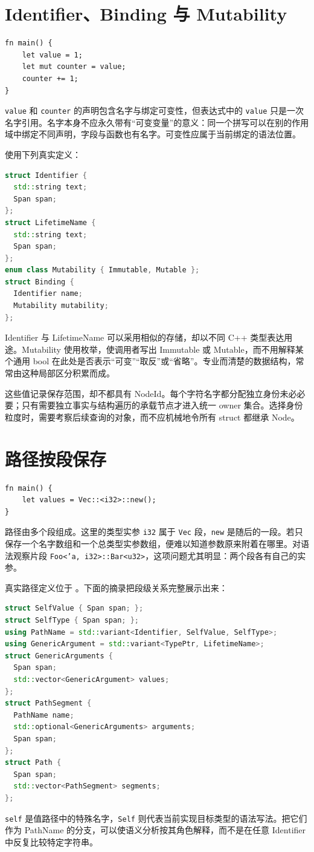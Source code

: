 \section{Identifier、Binding 与 Mutability}
\begin{lstlisting}[language=Rustless]
fn main() {
    let value = 1;
    let mut counter = value;
    counter += 1;
}
\end{lstlisting}
\texttt{value} 和 \texttt{counter} 的声明包含名字与绑定可变性，但表达式中的 \texttt{value} 只是一次名字引用。名字本身不应永久带有“可变变量”的意义：同一个拼写可以在别的作用域中绑定不同声明，字段与函数也有名字。可变性应属于当前绑定的语法位置。

 使用下列真实定义：
\begin{lstlisting}[language=C++]
struct Identifier {
  std::string text;
  Span span;
};
struct LifetimeName {
  std::string text;
  Span span;
};
enum class Mutability { Immutable, Mutable };
struct Binding {
  Identifier name;
  Mutability mutability;
};
\end{lstlisting}
Identifier 与 LifetimeName 可以采用相似的存储，却以不同 C++ 类型表达用途。Mutability 使用枚举，使调用者写出 Immutable 或 Mutable，而不用解释某个通用 bool 在此处是否表示“可变”“取反”或“省略”。专业而清楚的数据结构，常常由这种局部区分积累而成。

这些值记录保存范围，却不都具有 NodeId。每个字符名字都分配独立身份未必必要；只有需要独立事实与结构遍历的承载节点才进入统一 owner 集合。选择身份粒度时，需要考察后续查询的对象，而不应机械地令所有 struct 都继承 Node。

\section{路径按段保存}
\begin{lstlisting}[language=Rustless]
fn main() {
    let values = Vec::<i32>::new();
}
\end{lstlisting}
路径由多个段组成。这里的类型实参 \texttt{i32} 属于 \texttt{Vec} 段，\texttt{new} 是随后的一段。若只保存一个名字数组和一个总类型实参数组，便难以知道参数原来附着在哪里。对语法观察片段 \texttt{Foo<'a, i32>::Bar<u32>}，这项问题尤其明显：两个段各有自己的实参。

真实路径定义位于 。下面的摘录把段级关系完整展示出来：
\begin{lstlisting}[language=C++]
struct SelfValue { Span span; };
struct SelfType { Span span; };
using PathName = std::variant<Identifier, SelfValue, SelfType>;
using GenericArgument = std::variant<TypePtr, LifetimeName>;
struct GenericArguments {
  Span span;
  std::vector<GenericArgument> values;
};
struct PathSegment {
  PathName name;
  std::optional<GenericArguments> arguments;
  Span span;
};
struct Path {
  Span span;
  std::vector<PathSegment> segments;
};
\end{lstlisting}
\texttt{self} 是值路径中的特殊名字，\texttt{Self} 则代表当前实现目标类型的语法写法。把它们作为 PathName 的分支，可以使语义分析按其角色解释，而不是在任意 Identifier 中反复比较特定字符串。

